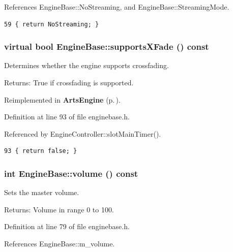 References Engine\-Base::No\-Streaming, and Engine\-Base::Streaming\-Mode.



\footnotesize\begin{verbatim}59 { return NoStreaming; }       
\end{verbatim}\normalsize 
{}
\subsubsection{\setlength{\rightskip}{0pt plus 5cm}virtual bool Engine\-Base::supports\-XFade () const\hspace{0.3cm}{\tt  [inline, virtual, inherited]}}\label{classEngineBase_EngineBasea13}


Determines whether the engine supports crossfading. \begin{Desc}
\item[Returns:]True if crossfading is supported. \end{Desc}


Reimplemented in {\bf Arts\-Engine} {\rm (p.\,\pageref{classArtsEngine_ArtsEnginea18})}.

Definition at line 93 of file enginebase.h.

Referenced by Engine\-Controller::slot\-Main\-Timer().



\footnotesize\begin{verbatim}93 { return false; }
\end{verbatim}\normalsize 
{}
\subsubsection{\setlength{\rightskip}{0pt plus 5cm}int Engine\-Base::volume () const\hspace{0.3cm}{\tt  [inline, inherited]}}\label{classEngineBase_EngineBasea10}


Sets the master volume. \begin{Desc}
\item[Returns:]Volume in range 0 to 100. \end{Desc}


Definition at line 79 of file enginebase.h.

References Engine\-Base::m\_\-volume.

